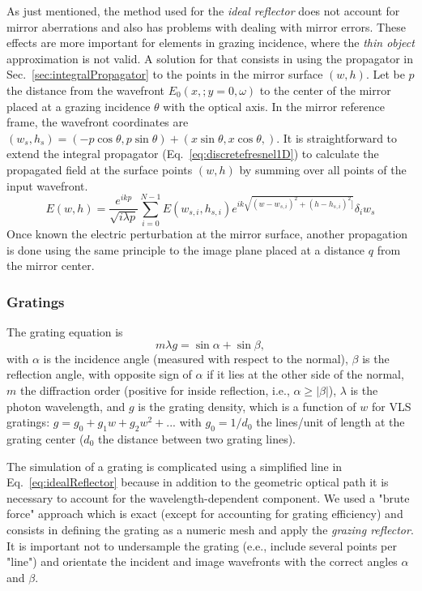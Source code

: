 \documentclass[]{spie}  %
\begin{document}
As just mentioned, the method used for the {\it ideal reflector} does not account for mirror aberrations and also has problems with dealing with mirror errors. These effects are more important for elements in grazing incidence, where the {\it thin object} approximation is not valid. A solution for that consists in using the propagator in Sec.~\ref{sec:integralPropagator} to the points in the mirror surface $(w,h)$. Let be $p$ the distance from the wavefront $E_0(x,;y=0,\omega)$ to the center of the mirror placed at a grazing incidence $\theta$ with the optical axis. In the mirror reference frame, the wavefront coordinates are $(w_s, h_s) =(-p \cos \theta, p \sin \theta) + (x \sin \theta, x \cos \theta,)$. It is straightforward to extend the integral propagator (Eq.~\ref{eq:discretefresnel1D}) to calculate the propagated field at the surface points $(w,h)$ by summing over all points of the input wavefront. 
\begin{equation}\label{eq:grazingPropagator}
 E(w,h) = \frac {e^{i k p }}{ \sqrt{i \lambda p}} \sum_{i=0}^{N-1}  E(w_{s,i},h_{s,i}) e^{i k \sqrt{(w - w_{s,i})^2 + (h - h_{s,i})^2]}} \delta_i w_s
\end{equation}
Once known the electric perturbation at the mirror surface, another propagation is done using the same principle to the image plane placed at a distance $q$ from the  mirror center. 

\subsubsection{Gratings}
\label{sec:grating}


The grating equation is
\begin{equation}
    m \lambda g = \sin\alpha + \sin\beta,
\end{equation}
with $\alpha$ is the incidence angle (measured with respect to the normal), $\beta$ is the reflection angle, with opposite sign of $\alpha$ if it lies at the other side of the normal, $m$ the diffraction order (positive for inside reflection, i.e., $\alpha \ge |\beta|$),
$\lambda$ is the photon wavelength, and $g$ is the grating density, which is a function of $w$ for VLS gratings: $g = g_0 + g_1 w + g_2 w^2 + ...$ with $g_0 = 1/d_0$ the lines/unit of length at the grating center ($d_0$ the distance between two grating lines).

The simulation of a grating is complicated using a simplified line in Eq.~\ref{eq:idealReflector} because in addition to the geometric optical path it is necessary to account for the wavelength-dependent component. We used a "brute force" approach which is exact (except for accounting for grating efficiency) and consists in defining the grating as a numeric mesh and apply the {\it grazing reflector}. It is important not to undersample the grating (e.e., include several points per "line") and orientate the incident and image wavefronts with the correct angles $\alpha$ and $\beta$.      
\end{document}
